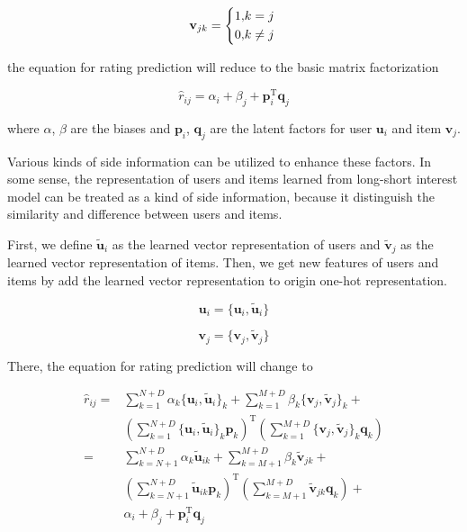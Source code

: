 \documentclass{llncs}
\begin{document}
\begin{equation}
\mathbf{v}_{jk} =
\left\{
\begin{aligned}
1, &k = j \\
0, &k \not= j
\end{aligned}
\right. \\
\end{equation}

the equation for rating prediction will reduce to the basic matrix factorization

\begin{equation}
\hat{r}_{ij} = \alpha_i + \beta_j + \mathbf{p}_i ^ \mathrm{T} \mathbf{q}_j
\end{equation}

where $\alpha$, $\beta$ are the biases and $\mathbf{p}_i$, $\mathbf{q}_j$
are the latent factors for user $\mathbf{u}_i$ and item $\mathbf{v}_j$.

Various kinds of side information can be utilized to enhance these factors.
In some sense, the representation of users and items
learned from long-short interest model can be treated as a kind of side information,
because it distinguish the similarity and difference between users and items.

First, we define $\tilde{\mathbf{u}}_i$ as
the learned vector representation of users and $\tilde{\mathbf{v}}_j$ as
the learned vector representation of items.
Then, we get new features of users and items by add the learned vector representation
to origin one-hot representation.

\begin{equation}
\mathbf{u}_{i} = \{ \mathbf{u}_{i} , \tilde{\mathbf{u}}_i \}
\end{equation}

\begin{equation}
\mathbf{v}_{j} = \{ \mathbf{v}_{j} , \tilde{\mathbf{v}}_j \}
\end{equation}

There, the equation for rating prediction will change to

\begin{equation}
\begin{aligned}
\hat{r}_{ij} =
&\sum_{k=1}^{N+D} \alpha_k \{ \mathbf{u}_i , \tilde{\mathbf{u}}_i \}_k +
\sum_{k=1}^{M+D} \beta_k  \{ \mathbf{v}_j , \tilde{\mathbf{v}}_j \}_k + \\
&\left( \sum_{k=1}^{N+D} \{ \mathbf{u}_i , \tilde{\mathbf{u}}_i \}_k \mathbf{p}_k \right) ^ \mathrm{T}
\left( \sum_{k=1}^{M+D} \{ \mathbf{v}_j , \tilde{\mathbf{v}}_j \}_k \mathbf{q}_k \right) \\
= &\sum_{k=N+1}^{N+D} \alpha_k \tilde{\mathbf{u}}_{ik} +
\sum_{k=M+1}^{M+D} \beta_k  \tilde{\mathbf{v}}_{jk} + \\
&\left( \sum_{k=N+1}^{N+D} \tilde{\mathbf{u}}_{ik} \mathbf{p}_k \right) ^ \mathrm{T}
\left( \sum_{k=M+1}^{M+D} \tilde{\mathbf{v}}_{jk} \mathbf{q}_k \right) + \\
&\alpha_i + \beta_j + \mathbf{p}_i ^ \mathrm{T} \mathbf{q}_j
\end{aligned}
\end{equation}
\end{document}
